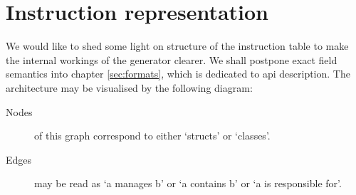 \section{Instruction representation}

\label{sec:instab}

We would like to shed some light on structure of the instruction table to make the internal workings of the generator clearer. We shall postpone exact field semantics into chapter \ref{sec:formats}, which is dedicated to api description. The architecture may be visualised by the following diagram:


\begin{description}
  \item [Nodes] of this graph correspond to either `structs' or `classes'.
  \item [Edges] may be read as `a manages b' or `a contains b' or `a is responsible for'.
\end{description}

